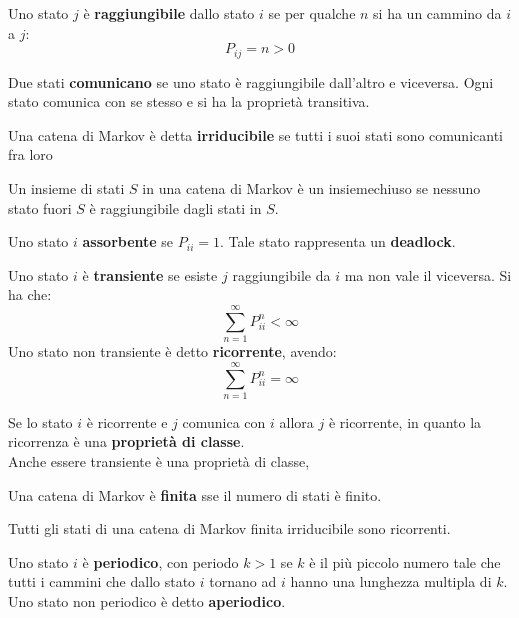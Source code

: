 \message{ !name(modprob.tex)}\documentclass[a4paper,12pt, oneside]{book}
\begin{document}
\begin{definizione}
  Uno stato $j$ è \textbf{raggiungibile} dallo stato $i$ se per qualche $n$ si
  ha un cammino da $i$ a $j$:
  \[P_{ij}=n>0\]
\end{definizione}
\begin{definizione}
  Due stati \textbf{comunicano} se uno stato è raggiungibile dall'altro e
  viceversa. Ogni stato comunica con se stesso e si ha la proprietà transitiva.
\end{definizione}
\begin{definizione}
  Una catena di Markov è detta \textbf{irriducibile} se tutti i suoi stati sono
  comunicanti fra loro 
\end{definizione}
\begin{definizione}
  Un insieme di stati $S$ in una catena di Markov è un insiemechiuso se nessuno
  stato fuori $S$ è raggiungibile dagli stati in $S$. 
\end{definizione}
\begin{definizione}
  Uno stato $i$ \textbf{assorbente} se $P_{ii}=1$. Tale stato rappresenta un
  \textbf{deadlock}.
\end{definizione}
\begin{definizione}
  Uno stato $i$ è \textbf{transiente} se esiste $j$ raggiungibile da $i$ ma non
  vale il viceversa. Si ha che:
  \[\sum_{n=1}^\infty P_{ii}^n<\infty\]
  Uno stato non transiente è detto \textbf{ricorrente}, avendo:
  \[\sum_{n=1}^\infty P_{ii}^n=\infty\]
\end{definizione}
\begin{teorema}
  Se lo stato $i$ è ricorrente e $j$ comunica con $i$ allora $j$ è ricorrente,
  in quanto la ricorrenza è una \textbf{proprietà di classe}.\\
  Anche essere transiente è una proprietà di classe,
\end{teorema}
\begin{definizione}
  Una catena di Markov è \textbf{finita} sse il numero di stati è finito.
\end{definizione}
\begin{teorema}
  Tutti gli stati di una catena di Markov finita irriducibile sono ricorrenti.
\end{teorema}
\begin{definizione}
  Uno stato $i$ è \textbf{periodico}, con periodo $k>1$ se $k$ è il più piccolo
  numero tale che tutti i cammini che dallo stato $i$ tornano ad $i$ hanno una
  lunghezza multipla di $k$.\\
  Uno stato non periodico è detto \textbf{aperiodico}.
\end{definizione}
\end{document}
